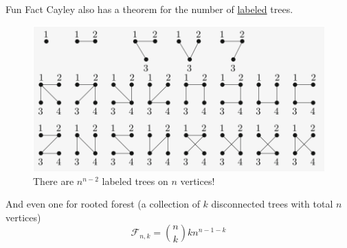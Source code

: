 \documentclass{beamer}
\begin{document}
    \begin{frame}{Fun Fact}
Cayley also has a theorem for the number of \underline{labeled} trees.

    \begin{figure}
        \centering
        \includegraphics[scale=0.5]{images/numbered-trees.png}
        \caption{There are $n^{n-2}$ labeled trees on $n$ vertices!}
        \label{fig:enter-label}
    \end{figure}
    \pause
    And even one for rooted forest (a collection of $k$ disconnected trees with total $n$ vertices)
    $$\mathcal{F}_{n,k}=\binom{n}{k}kn^{n-1-k}$$
    \end{frame}
\end{document}
